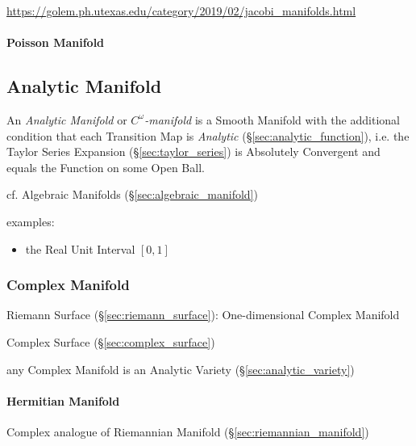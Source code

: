 \url{https://golem.ph.utexas.edu/category/2019/02/jacobi_manifolds.html}



\paragraph{Poisson Manifold}\label{sec:poisson_manifold}\hfill



\subsection{Analytic Manifold}\label{sec:analytic_manifold}

An \emph{Analytic Manifold} or \emph{$C^\omega$-manifold} is a Smooth Manifold
with the additional condition that each Transition Map is \emph{Analytic}
(\S\ref{sec:analytic_function}), i.e. the Taylor Series Expansion
(\S\ref{sec:taylor_series}) is Absolutely Convergent and equals the Function on
some Open Ball.

cf. Algebraic Manifolds (\S\ref{sec:algebraic_manifold})

examples:
\begin{itemize}
  \item the Real Unit Interval $[0,1]$
\end{itemize}



\subsubsection{Complex Manifold}\label{sec:complex_manifold}

Riemann Surface (\S\ref{sec:riemann_surface}): One-dimensional Complex
Manifold


Complex Surface (\S\ref{sec:complex_surface})

any Complex Manifold is an Analytic Variety (\S\ref{sec:analytic_variety})



\paragraph{Hermitian Manifold}\label{sec:hermitian_manifold}\hfill

Complex analogue of Riemannian Manifold (\S\ref{sec:riemannian_manifold})

